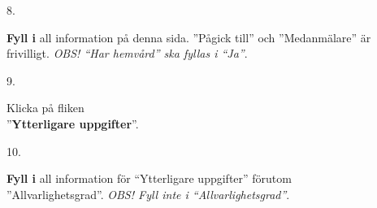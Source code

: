 \documentclass[paper=a5,DIV=15,headinclude,twoside=semi,openany,titlepage=firstiscover]{scrbook}
\begin{document}
\noindent\hrulefill
\newpage
\noindent\hrulefill

\vfill
\noindent
\begin{minipage}[t]{0.06\textwidth}
	\phantom{1}8.
\end{minipage}%
\begin{minipage}[t]{.94\textwidth}\raggedright
	\textbf{Fyll i} all information på denna sida. ”Pågick till” och ”Medanmälare” är frivilligt. \textit{OBS! ``Har hemvård'' ska fyllas i ``Ja''}.
\end{minipage}%
\vfill

\noindent\hrulefill

\vfill
\noindent
\begin{minipage}[t]{0.06\textwidth}
	\phantom{1}9.
\end{minipage}%
\begin{minipage}[t]{.54\textwidth}\raggedright
	Klicka på fliken\\”\textbf{Ytterligare uppgifter}”.
\end{minipage}%
\begin{minipage}[t]{.4\textwidth}
	\hfill{}
\end{minipage}
\vfill

\noindent\hrulefill

\vfill
\noindent
\begin{minipage}[t]{0.06\textwidth}
	10.
\end{minipage}%
\begin{minipage}[t]{.94\textwidth}\raggedright
	\textbf{Fyll i} all information för ``Ytterligare uppgifter'' förutom\\ ”Allvarlighetsgrad”. \textit{OBS! Fyll inte i ``Allvarlighetsgrad''}.
\end{minipage}%
\vfill
\end{document}
